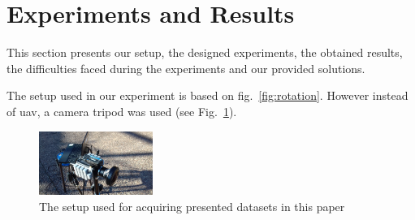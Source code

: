 \graphicspath{{./content/experiments/figures/}}

\section{Experiments and Results}
\label{sec:exp-res}
This section presents our setup, the designed experiments, the obtained
results, the difficulties faced during the experiments and our provided
solutions.


The setup used in our experiment is based on fig.~\ref{fig:rotation}.
However instead of \gls{uav}, a camera tripod was used (see
Fig.~\ref{fig:setup}).

\begin{figure}
  \centering
\includegraphics[width=0.33\textwidth]{./content/experiments/figures/setup.jpg}
\caption{The setup used for acquiring presented datasets in this paper}
\label{fig:setup}
\end{figure}

